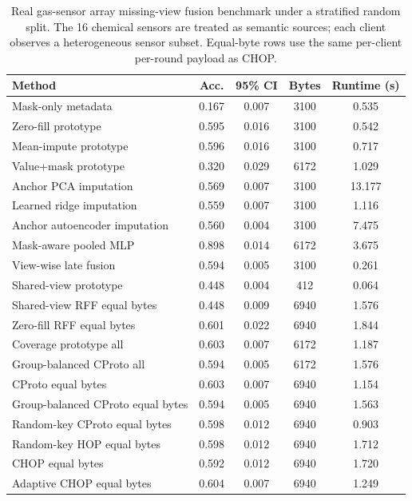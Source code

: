 \begin{table}[t]
\centering
\caption{Real gas-sensor array missing-view fusion benchmark under a stratified random split. The 16 chemical sensors are treated as semantic sources; each client observes a heterogeneous sensor subset. Equal-byte rows use the same per-client per-round payload as CHOP.}
\label{tab:if-gas-drift-random-fusion}
\scriptsize
\setlength{\tabcolsep}{3pt}
\renewcommand{\arraystretch}{0.94}
\begin{tabular}{lcccc}
\toprule
Method & Acc. & 95\% CI & Bytes & Runtime (s) \\
\midrule
Mask-only metadata & 0.167 & 0.007 & 3100 & 0.535 \\
Zero-fill prototype & 0.595 & 0.016 & 3100 & 0.542 \\
Mean-impute prototype & 0.596 & 0.016 & 3100 & 0.717 \\
Value+mask prototype & 0.320 & 0.029 & 6172 & 1.029 \\
Anchor PCA imputation & 0.569 & 0.007 & 3100 & 13.177 \\
Learned ridge imputation & 0.559 & 0.007 & 3100 & 1.116 \\
Anchor autoencoder imputation & 0.560 & 0.004 & 3100 & 7.475 \\
Mask-aware pooled MLP & 0.898 & 0.014 & 6172 & 3.675 \\
View-wise late fusion & 0.594 & 0.005 & 3100 & 0.261 \\
Shared-view prototype & 0.448 & 0.004 & 412 & 0.064 \\
Shared-view RFF equal bytes & 0.448 & 0.009 & 6940 & 1.576 \\
Zero-fill RFF equal bytes & 0.601 & 0.022 & 6940 & 1.844 \\
Coverage prototype all & 0.603 & 0.007 & 6172 & 1.187 \\
Group-balanced CProto all & 0.594 & 0.005 & 6172 & 1.576 \\
CProto equal bytes & 0.603 & 0.007 & 6940 & 1.154 \\
Group-balanced CProto equal bytes & 0.594 & 0.005 & 6940 & 1.563 \\
Random-key CProto equal bytes & 0.598 & 0.012 & 6940 & 0.903 \\
Random-key HOP equal bytes & 0.598 & 0.012 & 6940 & 1.712 \\
CHOP equal bytes & 0.592 & 0.012 & 6940 & 1.720 \\
Adaptive CHOP equal bytes & 0.604 & 0.007 & 6940 & 1.249 \\
\bottomrule
\end{tabular}
\end{table}
